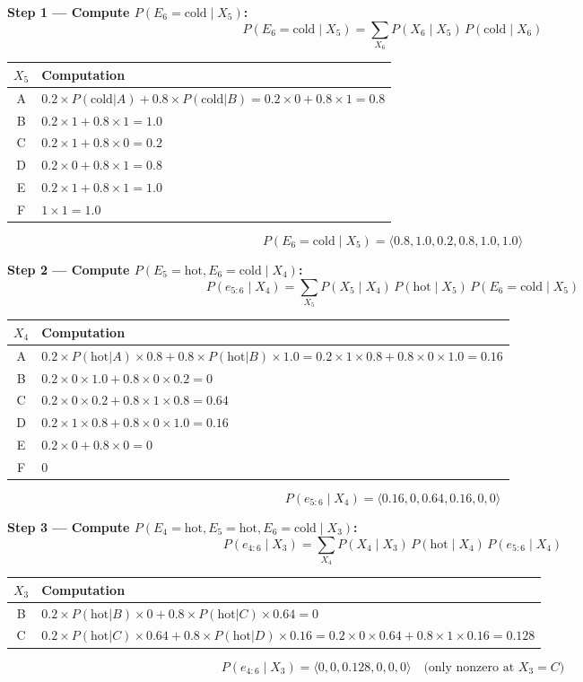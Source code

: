 \documentclass[12pt]{article}
\begin{document}
\textbf{Step 1 --- Compute $P(E_6{=}\text{cold}\mid X_5)$:}
\[
P(E_6{=}\text{cold}\mid X_5)=\sum_{X_6}P(X_6\mid X_5)\,P(\text{cold}\mid X_6)
\]
\begin{center}
\begin{tabular}{cl}
\toprule
$X_5$ & Computation\\
\midrule
A & $0.2\times P(\text{cold}|A)+0.8\times P(\text{cold}|B)=0.2\times0+0.8\times1=0.8$\\
B & $0.2\times1+0.8\times1=1.0$\\
C & $0.2\times1+0.8\times0=0.2$\\
D & $0.2\times0+0.8\times1=0.8$\\
E & $0.2\times1+0.8\times1=1.0$\\
F & $1\times1=1.0$\\
\bottomrule
\end{tabular}
\end{center}
\[
P(E_6{=}\text{cold}\mid X_5)=\langle0.8,1.0,0.2,0.8,1.0,1.0\rangle
\]

\textbf{Step 2 --- Compute $P(E_5{=}\text{hot},E_6{=}\text{cold}\mid X_4)$:}
\[
P(e_{5:6}\mid X_4)=\sum_{X_5}P(X_5\mid X_4)\,P(\text{hot}\mid X_5)\,P(E_6{=}\text{cold}\mid X_5)
\]
\begin{center}
\begin{tabular}{cl}
\toprule
$X_4$ & Computation\\
\midrule
A & $0.2\times P(\text{hot}|A)\times0.8+0.8\times P(\text{hot}|B)\times1.0
    =0.2\times1\times0.8+0.8\times0\times1.0=0.16$\\
B & $0.2\times0\times1.0+0.8\times0\times0.2=0$\\
C & $0.2\times0\times0.2+0.8\times1\times0.8=0.64$\\
D & $0.2\times1\times0.8+0.8\times0\times1.0=0.16$\\
E & $0.2\times0+0.8\times0=0$\\
F & $0$\\
\bottomrule
\end{tabular}
\end{center}
\[
P(e_{5:6}\mid X_4)=\langle0.16,0,0.64,0.16,0,0\rangle
\]

\textbf{Step 3 --- Compute $P(E_4{=}\text{hot},E_5{=}\text{hot},E_6{=}\text{cold}\mid X_3)$:}
\[
P(e_{4:6}\mid X_3)=\sum_{X_4}P(X_4\mid X_3)\,P(\text{hot}\mid X_4)\,P(e_{5:6}\mid X_4)
\]
\begin{center}
\begin{tabular}{cl}
\toprule
$X_3$ & Computation\\
\midrule
B & $0.2\times P(\text{hot}|B)\times0+0.8\times P(\text{hot}|C)\times0.64=0$\\
C & $0.2\times P(\text{hot}|C)\times0.64+0.8\times P(\text{hot}|D)\times0.16
    =0.2\times0\times0.64+0.8\times1\times0.16=0.128$\\
\bottomrule
\end{tabular}
\end{center}
\[
P(e_{4:6}\mid X_3)=\langle0,0,0.128,0,0,0\rangle
\quad\text{(only nonzero at }X_3{=}C\text{)}
\]
\end{document}
